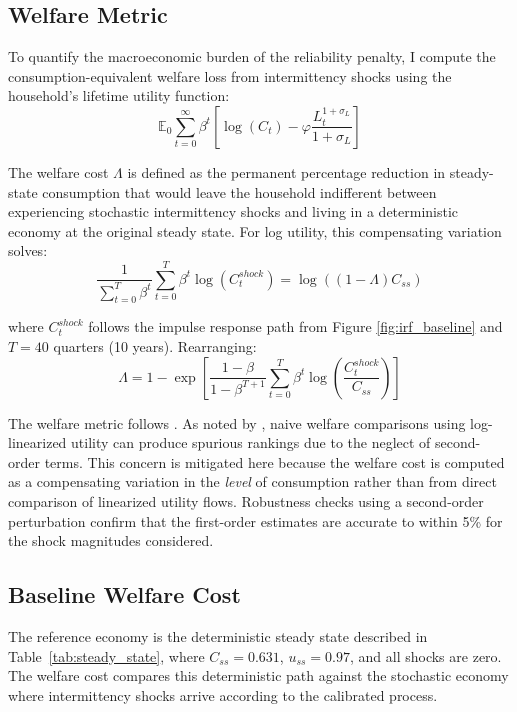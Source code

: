 \documentclass[12pt, a4paper]{article}
\begin{document}
\subsection{Welfare Metric}

To quantify the macroeconomic burden of the reliability penalty, I compute the consumption-equivalent welfare loss from intermittency shocks using the household's lifetime utility function:
\begin{equation}
\mathbb{E}_0 \sum_{t=0}^{\infty} \beta^t \left[ \log(C_t) - \varphi \frac{L_t^{1+\sigma_L}}{1+\sigma_L} \right]
\end{equation}

The welfare cost $\Lambda$ is defined as the permanent percentage reduction in steady-state consumption that would leave the household indifferent between experiencing stochastic intermittency shocks and living in a deterministic economy at the original steady state. For log utility, this compensating variation solves:
\begin{equation}
\frac{1}{\sum_{t=0}^{T} \beta^t} \sum_{t=0}^{T} \beta^t \log(C_t^{shock}) = \log((1-\Lambda)C_{ss})
\end{equation}

where $C_t^{shock}$ follows the impulse response path from Figure \ref{fig:irf_baseline} and $T = 40$ quarters (10 years). Rearranging:
\begin{equation}
\Lambda = 1 - \exp\left[\frac{1-\beta}{1-\beta^{T+1}} \sum_{t=0}^{T} \beta^t \log\left(\frac{C_t^{shock}}{C_{ss}}\right)\right]
\label{eq:welfare_formula}
\end{equation}

The welfare metric follows \citet{lucas1987}. As noted by \citet{kim2003}, naive welfare comparisons using log-linearized utility can produce spurious rankings due to the neglect of second-order terms. This concern is mitigated here because the welfare cost is computed as a compensating variation in the \textit{level} of consumption rather than from direct comparison of linearized utility flows. Robustness checks using a second-order perturbation confirm that the first-order estimates are accurate to within 5\% for the shock magnitudes considered.

\subsection{Baseline Welfare Cost}

The reference economy is the deterministic steady state described in Table~\ref{tab:steady_state}, where $C_{ss} = 0.631$, $u_{ss} = 0.97$, and all shocks are zero. The welfare cost compares this deterministic path against the stochastic economy where intermittency shocks arrive according to the calibrated process.
\end{document}
